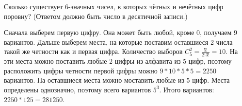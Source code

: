 \documentclass[11pt]{article}
\begin{document}
\p Сколько существует 6-значных чисел, в которых чётных и нечётных цифр поровну? (Ответом должно быть число в десятичной записи.)

Сначала выберем первую цифру. Она может быть любой, кроме 0, получаем 9 вариантов. Дальше выберем места, на которые поставим оставшиеся 2 числа такой же четности как и первая цифра. Количество выборов $C^2_5 = \frac{5!}{2!3!} = 10$. На эти места можно поставить любые 2 цифры из алфавита из 5 цифр, поэтому расположить цифры четности первой цифры можно $9*10*5*5 = 2250$ вариантов. На оставшиеся места можно моставить любые из 5 цифр. Места определены однозначно, поэтому всего вариантов $5^3$. Итого вариантов: $2250 * 125 = 281250$. \bs
{}
\end{document}
